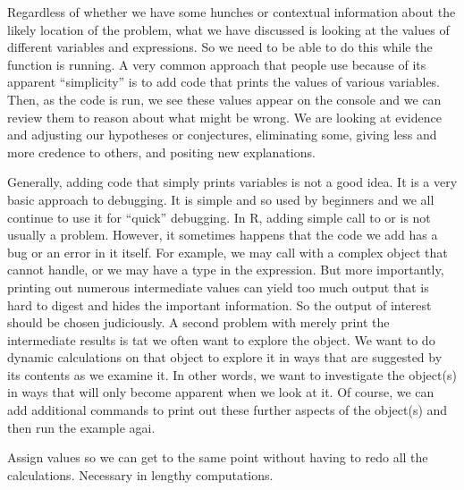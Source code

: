 Regardless of whether we have some hunches or contextual information
about the likely location of the problem, what we have discussed is
looking at the values of different variables and expressions.  So we
need to be able to do this while the function is running.  A very
common approach that people use because of its apparent ``simplicity''
is to add code that prints the values of various variables.  Then, as
the code is run, we see these values appear on the console and we can
review them to reason about what might be wrong. We are looking at
evidence and adjusting our hypotheses or conjectures, eliminating
some, giving less and more credence to others, and positing new
explanations.

Generally, adding code that simply prints variables is not a good
idea.  It is a very basic approach to debugging. It is simple and so
used by beginners and we all continue to use it for ``quick''
debugging.  In R, adding simple call to  or 
is not usually a problem. However, it sometimes happens that the code
we add has a bug or an error in it itself.  For example, we may call
 with a complex object that  cannot handle, or
we may have a type in the expression.  But more importantly, printing
out numerous intermediate values can yield too much output that is
hard to digest and hides the important information. So the output of
interest should be chosen judiciously. A second problem with merely
print the intermediate results is tat we often want to explore the
object.  We want to do dynamic calculations on that object to explore
it in ways that are suggested by its contents as we examine it. In
other words, we want to investigate the object(s) in ways that will
only become apparent when we look at it.  Of course, we can add
additional commands to print out these further aspects of the
object(s) and then run the example agai.




Assign values so we can get to the same point without having
to redo all the calculations. Necessary in lengthy computations.









